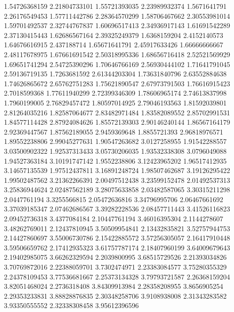   1.54726368159    2.21804733101
  1.55721393035    2.23989932374
   1.5671641791    2.26176549453
  1.57711442786    2.28364570299
  1.58706467662    2.30553981014
  1.59701492537    2.32744767837
  1.60696517413    2.34936917143
  1.61691542289    2.37130415443
  1.62686567164    2.39325249379
   1.6368159204     2.4152140573
  1.64676616915      2.437188714
  1.65671641791    2.45917633426
  1.66666666667    2.48117678975
  1.67661691542    2.50318995336
  1.68656716418    2.52521569929
  1.69651741294    2.54725390296
  1.70646766169    2.56930444102
  1.71641791045    2.59136719135
   1.7263681592    2.61344203304
  1.73631840796    2.63552884638
  1.74626865672    2.65762751283
  1.75621890547    2.67973791503
  1.76616915423     2.7018599368
  1.77611940299    2.72399346309
  1.78606965174    2.74613837998
   1.7960199005    2.76829457472
  1.80597014925    2.79046193563
  1.81592039801    2.81264035216
  1.82587064677    2.83482971484
  1.83582089552    2.85702991531
  1.84577114428    2.87924084626
  1.85572139303    2.90146240144
  1.86567164179    2.92369447567
  1.87562189055     2.9459369648
   1.8855721393    2.96818976571
  1.89552238806    2.99045277631
  1.90547263682     3.0127258955
  1.91542288557    3.03500902322
  1.92537313433    3.05730206035
  1.93532338308     3.0796049088
  1.94527363184    3.10191747142
   1.9552238806    3.12423965202
  1.96517412935    3.14657135539
  1.97512437811    3.16891248724
  1.98507462687    3.19126295422
  1.99502487562    3.21362266391
  2.00497512438    3.23599152478
  2.01492537313    3.25836944624
  2.02487562189    3.28075633858
  2.03482587065    3.30315211298
   2.0447761194     3.3255566815
  2.05472636816    3.34796995706
  2.06467661692    3.37039185347
  2.07462686567    3.39282228536
  2.08457711443    3.41526116823
  2.09452736318     3.4377084184
  2.10447761194    3.46016395304
   2.1144278607    3.48262769011
  2.12437810945    3.50509954841
  2.13432835821    3.52757944753
  2.14427860697    3.55006730786
  2.15422885572    3.57256305057
  2.16417910448    3.59506659762
  2.17412935323    3.61757787174
  2.18407960199    3.64009679643
  2.19402985075    3.66262329594
   2.2039800995    3.68515729526
  2.21393034826    3.70769872016
  2.22388059701     3.7302474971
  2.23383084577    3.75280355329
  2.24378109453    3.77536681667
  2.25373134328    3.79793721587
  2.26368159204    3.82051468024
   2.2736318408    3.84309913984
  2.28358208955     3.8656905254
  2.29353233831    3.88828876835
  2.30348258706     3.9108938008
  2.31343283582    3.93350555552
  2.32338308458    3.95612396596
